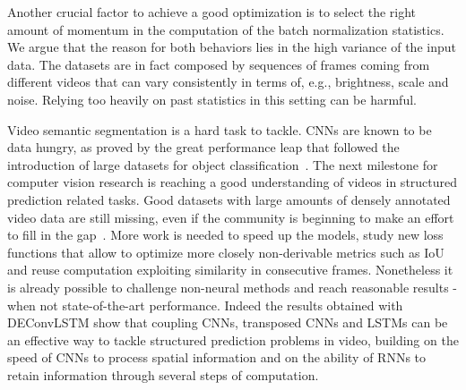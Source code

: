 Another crucial factor to achieve a good optimization is to select the right
amount of momentum in the computation of the batch normalization statistics. We
argue that the reason for both behaviors lies in the high variance of the input
data. The datasets are in fact composed by sequences of frames coming from
different videos that can vary consistently in terms of, e.g., brightness,
scale and noise. Relying too heavily on past statistics in this setting can be
harmful.

Video semantic segmentation is a hard task to tackle. CNNs are known to be
data hungry, as proved by the great performance leap that followed the
introduction of large datasets for object classification~\citep{ILSVRCarxiv14}.
The next milestone for computer vision research is reaching a good
understanding of videos in structured prediction related tasks. Good datasets
with large amounts of densely annotated video data are still missing, even if
the community is beginning to make an effort to fill in the gap~\citep[%
see~e.g.,~][]{Perazzi2016,lin2014microsoft}. More work is needed to speed up
the models, study new loss functions that allow to optimize more closely
non-derivable metrics such as IoU and reuse computation exploiting similarity
in consecutive frames. Nonetheless it is already possible to challenge
non-neural methods and reach reasonable results - when not state-of-the-art
performance.  Indeed the results obtained with DEConvLSTM show that coupling
CNNs, transposed CNNs and LSTMs can be an effective way to tackle structured
prediction problems in video, building on the speed of CNNs to process spatial
information and on the ability of RNNs to retain information through several
steps of computation.


